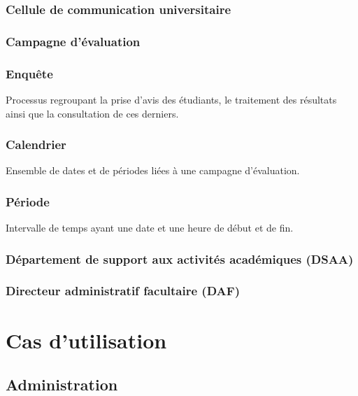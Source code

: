 \documentclass[a4paper,11pt]{report}
\begin{document}
\subsection{Cellule de communication universitaire}

\subsection{Campagne d'évaluation}


\subsection{Enquête}
Processus regroupant la prise d'avis des étudiants, le traitement des résultats ainsi que la consultation de ces derniers.

\subsection{Calendrier}
Ensemble de dates et de périodes liées à une campagne d'évaluation.

\subsection{Période}
Intervalle de temps ayant une date et une heure de début et de fin.

\subsection{Département de support aux activités académiques (DSAA)}

\subsection{Directeur administratif facultaire (DAF)}














\chapter{Cas d'utilisation}

\section{Administration}
\end{document}
